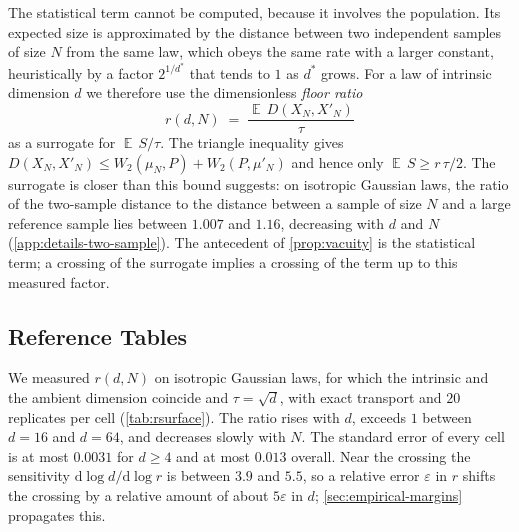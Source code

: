 \documentclass[twoside,11pt]{article}
\theoremstyle{plain}
\theoremstyle{definition}
\theoremstyle{remark}
\newcommand{\Wtwo}{\ensuremath{W_2}}
\DeclareMathOperator{\E}{\mathbb{E}}
\begin{document}
The statistical term cannot be computed, because it involves the
population. Its expected size is approximated by the distance between two
independent samples of size $N$ from the same law, which obeys the same rate
with a larger constant, heuristically by a factor $2^{1/d^*}$ that tends to
$1$ as $d^*$ grows. For a law of intrinsic dimension $d$ we therefore use
the dimensionless \emph{floor ratio}
\begin{equation}\label{eq:surrogate}
  r(d, N) \;=\; \frac{\E\, D(X_N, X'_N)}{\tau}
\end{equation}
as a surrogate for $\E\,S/\tau$. The triangle inequality gives $D(X_N, X'_N) \leq \Wtwo(\mu_N, P) + \Wtwo(P, \mu'_N)$ and hence only $\E\,S \geq r\,\tau/2$. The surrogate is closer than this bound suggests: on
isotropic Gaussian laws, the ratio of the two-sample distance to the
distance between a sample of size $N$ and a large reference sample lies
between $1.007$ and $1.16$, decreasing with $d$ and $N$
(\cref{app:details-two-sample}). The antecedent of \cref{prop:vacuity} is the
statistical term; a crossing of the surrogate implies a crossing of the
term up to this measured factor.

\subsection{Reference Tables}\label{sec:cert-table}

We measured $r(d, N)$ on isotropic Gaussian laws, for which the intrinsic
and the ambient dimension coincide and $\tau = \sqrt{d}$, with exact
transport and $20$ replicates per cell (\cref{tab:rsurface}). The ratio
rises with $d$, exceeds $1$ between $d = 16$ and $d = 64$, and decreases
slowly with $N$. The standard error of every cell is at most $0.0031$ for
$d \geq 4$ and at most $0.013$ overall. Near the crossing the sensitivity
$\mathrm{d}\log d / \mathrm{d}\log r$ is between $3.9$ and $5.5$, so a relative error $\varepsilon$ in $r$ shifts the crossing by a relative
amount of about $5\varepsilon$ in $d$; \cref{sec:empirical-margins} propagates this.
\end{document}
